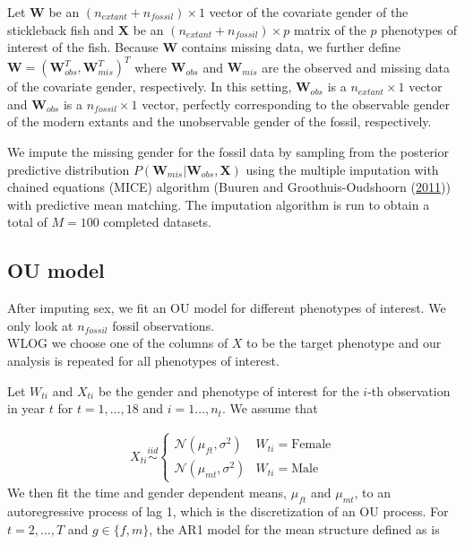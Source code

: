 \documentclass[
  12pt,
]{article}
\begin{document}
Let \(\boldsymbol{W}\) be an \((n_{extant} + n_{fossil}) \times 1\)
vector of the covariate gender of the stickleback fish and
\(\boldsymbol{X}\) be an \((n_{extant} + n_{fossil}) \times p\) matrix
of the \(p\) phenotypes of interest of the fish. Because
\(\boldsymbol{W}\) contains missing data, we further define
\(\boldsymbol{W} = (\boldsymbol{W}_{obs}^T,\boldsymbol{W}_{mis}^T)^T\)
where \(\boldsymbol{W}_{obs}\) and \(\boldsymbol{W}_{mis}\) are the
observed and missing data of the covariate gender, respectively. In this
setting, \(\boldsymbol{W}_{obs}\) is a \(n_{extant} \times 1\) vector
and \(\boldsymbol{W}_{obs}\) is a \(n_{fossil} \times 1\) vector,
perfectly corresponding to the observable gender of the modern extants
and the unobservable gender of the fossil, respectively.

We impute the missing gender for the fossil data by sampling from the
posterior predictive distribution
\(P(\boldsymbol{W}_{mis}|\boldsymbol{W}_{obs}, \boldsymbol{X})\) using
the multiple imputation with chained equations (MICE) algorithm (Buuren
and Groothuis-Oudshoorn (\protect\hyperlink{ref-MICE}{2011})) with
predictive mean matching. The imputation algorithm is run to obtain a
total of \(M = 100\) completed datasets.

\hypertarget{ou-model}{%
\subsection{OU model}\label{ou-model}}

After imputing sex, we fit an OU model for different phenotypes of
interest. We only look at \(n_{fossil}\) fossil observations.\\
WLOG we choose one of the columns of \(X\) to be the target phenotype
and our analysis is repeated for all phenotypes of interest.

Let \(W_{ti}\) and \(X_{ti}\) be the gender and phenotype of interest
for the \(i\)-th observation in year \(t\) for \(t = 1, \ldots, 18\) and
\(i = 1\ldots,n_{t}\). We assume that

\[
\begin{aligned}
X_{ti} \overset{iid}{\sim}\left\{\begin{array}{ll} \mathcal{N}(\mu_{ft},\sigma^2) & W_{ti} = \text{Female} \\ \mathcal{N}(\mu_{mt},\sigma^2) & W_{ti} = \text{Male} \end{array}\right.
\end{aligned}
\] We then fit the time and gender dependent means, \(\mu_{ft}\) and
\(\mu_{mt}\), to an autoregressive process of lag 1, which is the
discretization of an OU process. For \(t = 2,\ldots,T\) and
\(g \in \{f,m\}\), the AR1 model for the mean structure defined as is
\end{document}

